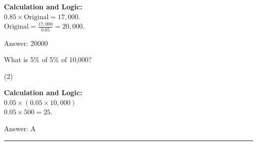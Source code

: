 \documentclass[11pt,paper=a4,answers]{exam}
\begin{document}
\begin{questions}
\begin{solution}
\textbf{Calculation and Logic:} \\
$0.85 \times \text{Original} = 17,000$. \\
$\text{Original} = \frac{17,000}{0.85} = 20,000$.

\vspace{30pt}

Answer: \colorbox{yellow!100}{20000}
\end{solution}

\vspace{60pt}

\question
What is 5\% of 5\% of 10,000?
\begin{tasks}(2)
\end{tasks}

\begin{solution}
\textbf{Calculation and Logic:} \\
$0.05 \times (0.05 \times 10,000)$ \\
$0.05 \times 500 = 25$.

\vspace{30pt}

Answer: \colorbox{yellow!100}{A}
\end{solution}



\end{questions}
\begin{center}
\rule{.5\textwidth}{1pt}
\end{center}
\end{document}

